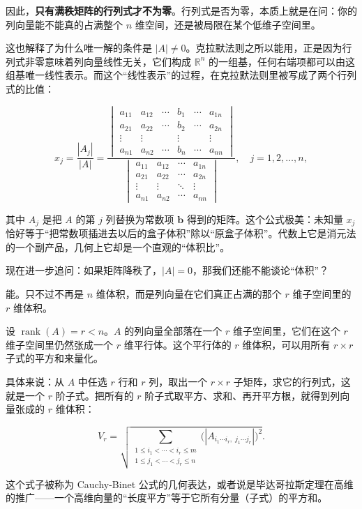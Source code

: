 \documentclass[UTF8]{ctexbook}
\begin{document}
因此，\textbf{只有满秩矩阵的行列式才不为零}。行列式是否为零，本质上就是在问：你的列向量能不能真的占满整个 $n$ 维空间，还是被局限在某个低维子空间里。

这也解释了为什么唯一解的条件是 $|A|\neq 0$。克拉默法则之所以能用，正是因为行列式非零意味着列向量线性无关，它们构成 $\mathbb{R}^n$ 的一组基，任何右端项都可以由这组基唯一线性表示。而这个“线性表示”的过程，在克拉默法则\label{Cramer}里被写成了两个行列式的比值：

\[
x_j=\frac{|A_j|}{|A|}= \frac{
\begin{vmatrix}
a_{11} & a_{12} & \cdots & b_1 & \cdots & a_{1n} \\
a_{21} & a_{22} & \cdots & b_2 & \cdots & a_{2n} \\
\vdots & \vdots & & \vdots & & \vdots \\
a_{n1} & a_{n2} & \cdots & b_n & \cdots & a_{nn}
\end{vmatrix}
}{
\begin{vmatrix}
a_{11} & a_{12} & \cdots & a_{1n} \\
a_{21} & a_{22} & \cdots & a_{2n} \\
\vdots & \vdots & \ddots & \vdots \\
a_{n1} & a_{n2} & \cdots & a_{nn}
\end{vmatrix}
}, \quad j = 1, 2, \dots, n,
\]

其中 $A_j$ 是把 $A$ 的第 $j$ 列替换为常数项 $\mathbf{b}$ 得到的矩阵。这个公式极美：未知量 $x_j$ 恰好等于“把常数项插进去以后的盒子体积”除以“原盒子体积”。代数上它是消元法的一个副产品，几何上它却是一个直观的“体积比”。

现在进一步追问：如果矩阵降秩了，$|A|=0$，那我们还能不能谈论“体积”？

能。只不过不再是 $n$ 维体积，而是列向量在它们真正占满的那个 $r$ 维子空间里的 $r$ 维体积。

设 $\operatorname{rank}(A)=r<n$。$A$ 的列向量全部落在一个 $r$ 维子空间里，它们在这个 $r$ 维子空间里仍然张成一个 $r$ 维平行体。这个平行体的 $r$ 维体积，可以用所有 $r\times r$ 子式的平方和来量化。

具体来说：从 $A$ 中任选 $r$ 行和 $r$ 列，取出一个 $r\times r$ 子矩阵，求它的行列式，这就是一个 $r$ 阶子式。把所有的 $r$ 阶子式取平方、求和、再开平方根，就得到列向量张成的 $r$ 维体积：

\[
V_r=\sqrt{\sum_{\substack{1\le i_1<\cdots<i_r\le m\\ 1\le j_1<\cdots<j_r\le n}}
\bigl(|A_{i_1\cdots i_r,\;j_1\cdots j_r}|\bigr)^2}.
\]

这个式子被称为 Cauchy-Binet 公式的几何表达，或者说是毕达哥拉斯定理在高维的推广——一个高维向量的“长度平方”等于它所有分量（子式）的平方和。
\end{document}

